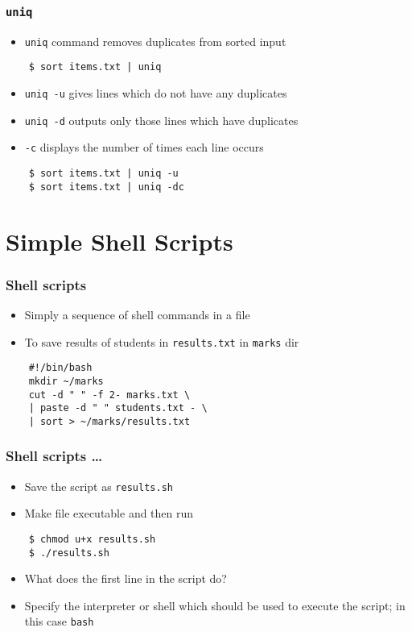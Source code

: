 \documentclass[12pt,compress]{beamer}
\newcounter{time}
\begin{document}
\begin{frame}[fragile]
  \frametitle{\texttt{uniq}}
  \begin{itemize}
  \item \texttt{uniq} command removes duplicates from \alert{sorted} input
  \end{itemize}
  \begin{lstlisting}
    $ sort items.txt | uniq
  \end{lstlisting} %
  \begin{itemize}
  \item \texttt{uniq -u} gives lines which do not have any duplicates
  \item \texttt{uniq -d} outputs only those lines which have duplicates
  \item \texttt{-c} displays the number of times each line occurs 
  \end{itemize}
  \begin{lstlisting}
    $ sort items.txt | uniq -u 
    $ sort items.txt | uniq -dc
  \end{lstlisting} %
\end{frame}

\section{Simple Shell Scripts}

\begin{frame}[fragile]
  \frametitle{Shell scripts}
  \begin{itemize}
  \item Simply a sequence of shell commands in a file
  \item To save results of students in \texttt{results.txt} in
    \texttt{marks} dir
  \end{itemize}
  \begin{lstlisting}
    #!/bin/bash
    mkdir ~/marks
    cut -d " " -f 2- marks.txt \
    | paste -d " " students.txt - \
    | sort > ~/marks/results.txt
  \end{lstlisting} %
\end{frame}

\begin{frame}[fragile]
  \frametitle{Shell scripts \ldots}
  \begin{itemize}
  \item Save the script as \texttt{results.sh}
  \item Make file executable and then run
  \end{itemize}
  \begin{lstlisting}
    $ chmod u+x results.sh
    $ ./results.sh
  \end{lstlisting} %
  \begin{itemize}
  \item What does the first line in the script do?
  \item Specify the interpreter or shell which should be used to
    execute the script; in this case \texttt{bash}
  \end{itemize}
\end{frame}
\end{document}
